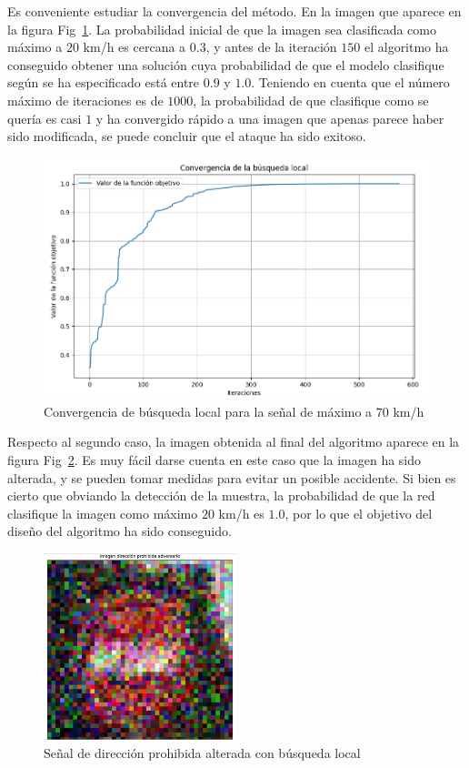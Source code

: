 Es conveniente estudiar la convergencia del método. En la imagen que aparece en la figura Fig~\ref{fig:evolucion1}. La probabilidad inicial de que la imagen sea clasificada como máximo a $20$ km/h es cercana a $0.3$, y antes de la iteración $150$ el algoritmo ha conseguido obtener una solución cuya probabilidad de que el modelo clasifique según se ha especificado está entre $0.9$ y $1.0$. Teniendo en cuenta que el número máximo de iteraciones es de $1000$, la probabilidad de que clasifique como se quería es casi $1$ y ha convergido rápido a una imagen que apenas parece haber sido modificada, se puede concluir que el ataque ha sido exitoso.

\begin{figure}[H]
    \centering
        \centering
        \includegraphics[width=\textwidth]{img/evolucion_max_70_bl.png}
        \caption{Convergencia de búsqueda local para la señal de máximo a $70$ km/h}
        \label{fig:evolucion1}
\end{figure}

Respecto al segundo caso, la imagen obtenida al final del algoritmo aparece en la figura Fig~\ref{fig:dirprohibbl}. Es muy fácil darse cuenta en este caso que la imagen ha sido alterada, y se pueden tomar medidas para evitar un posible accidente. Si bien es cierto que obviando la detección de la muestra, la probabilidad de que la red clasifique la imagen como máximo $20$ km/h es $1.0$, por lo que el objetivo del diseño del algoritmo ha sido conseguido.

\begin{figure}[H]
    \centering
        \centering
        \includegraphics[width=0.5\textwidth,height=0.5\textwidth]{img/dir_prohib_detectada_como_max_20.png}
        \caption{Señal de dirección prohibida alterada con búsqueda local}
        \label{fig:dirprohibbl}
\end{figure}

